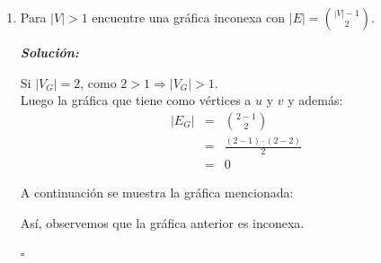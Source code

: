 \documentclass{article}
\begin{document}
\begin{enumerate}
\begin{enumerate}
\begin{proof}
\begin{itemize}
            Nótese que de lo anterior se infiere que $G - \{x\}$ es conexa
            \footnote{Esto ya que $|E_{G - \{x\}}| = {|V_G| \choose 2}$.}
            y así $G + e$ (con $e \in E_G$)
            \begin{eqnarray*}
              |E_{G +e}| &=& {|V| -1 \choose 2} +1\\
              &>& {|V| -1 \choose 2}
            \end{eqnarray*}
            es conexa, pues no hay lazos y no hay aristas múltiples en $G$.

            Entonces, tenemos que la nueva arista está comprendida entre $x$ y algún otro
            vértice en $V_{G - \{x\}}$. Por lo que habrá una $xy$-trayectoria para $y \in E_G$.
        \end{itemize}
        De lo anterior, concluimos que
        $|E_G| > {|V| -1 \choose 2} \Rightarrow G \text{ es conexa.}$
      \end{proof}

    \item Para $|V| > 1$ encuentre una gr\'afica inconexa con $|E| = {|V|-1
      \choose 2}$.

      \textbf{\textit{Solución:}}

      Si $|V_G| = 2$, como $2 > 1 \Rightarrow |V_G| > 1$. \\
      Luego la gráfica que tiene como vértices a $u$ y $v$ y además:
      \begin{eqnarray*}
        |E_G| &=& {2 -1 \choose 2}\\
        &=& \frac{(2 -1) \cdot (2 -2)}{2}\\
        &=& 0
      \end{eqnarray*}

      A continuación se muestra la gráfica mencionada:

      \begin{figure}[ht!]
        \centering
      \end{figure}

      Así, observemos que la gráfica anterior es inconexa.

      \hfill $\square$
  \end{enumerate}


\end{enumerate}
\end{document}
